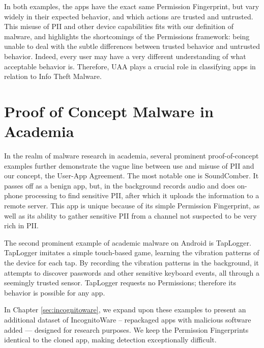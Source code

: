 In both examples, the apps have the exact same Permission Fingerprint, but vary widely in their expected behavior, and which actions are trusted and untrusted. This misuse of PII and other device capabilities fits with our definition of malware, and highlights the shortcomings of the Permissions framework: being unable to deal with the subtle differences between trusted behavior and untrusted behavior. Indeed, every user may have a very different understanding of what acceptable behavior is. Therefore, UAA plays a crucial role in classifying apps in relation to Info Theft Malware.

\section{Proof of Concept Malware in Academia}
In the realm of malware research in academia, several prominent proof-of-concept examples further demonstrate the vague line between use and misuse of PII and our concept, the User-App Agreement. The most notable one is SoundComber\citep{schlegel2011soundcomber}. It passes off as a benign app, but, in the background records audio and does on-phone processing to find sensitive PII, after which it uploads the information to a remote server. This app is unique because of its simple Permission Fingerprint, as well as its ability to gather sensitive PII from a channel not suspected to be very rich in PII.

The second prominent example of academic malware on Android is TapLogger\citep{xu2012taplogger}. TapLogger imitates a simple touch-based game, learning the vibration patterns of the device for each tap. By recording the vibration patterns in the background, it attempts to discover passwords and other sensitive keyboard events, all through a seemingly trusted sensor. TapLogger requests no Permissions; therefore its behavior is possible for any app. 

In Chapter \ref{sec:incognitoware}, we expand upon these examples to present an additional dataset of IncognitoWare -- repackaged apps with malicious software added --- designed for research purposes. We keep the Permission Fingerprints identical to the cloned app, making detection exceptionally difficult. 

